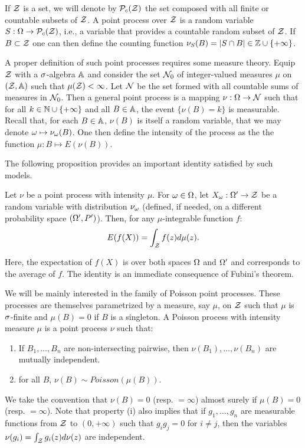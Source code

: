 If ${\mathcal Z}$ is a set, we will denote by ${\mathcal P}_c({\mathcal Z})$ the set composed with all finite or countable subsets of ${\mathcal Z}$. 
A point process over ${\mathcal Z}$ is a random variable $S: \Omega \to {\mathcal P}_c({\mathcal Z})$, i.e., a variable that provides a countable random subset of ${\mathcal Z}$. If $B\subset {\mathcal Z}$ one can then define the counting function $\nu_S(B) = |S \cap B| \in {\mathbb{Z}}\cup\{+\infty\}$.

A proper definition of such point processes requires some measure theory. Equip ${\mathcal Z}$ with a $\sigma$-algebra ${\mathbb A}$ and consider the set ${\mathcal N}_0$ of integer-valued measures $\mu$ on $({\mathcal Z}, {\mathbb A})$ such that $\mu({\mathcal Z}) <\infty$. Let ${\mathcal N}$ be the set formed with all countable sums of measures in ${\mathcal N}_0$. Then a general point process is a mapping $\nu: \Omega \to {\mathcal N}$ such that for all $k\in  {\mathbb{N}}\cup\{+\infty\}$ and  all $B\in {\mathbb A}$, the event $\{\nu(B) = k\}$ is measurable. Recall that, for each $B\in {\mathbb A}$, $\nu(B)$ is itself a random variable, that we may denote $\omega \mapsto \nu_\omega(B)$. One then define the intensity of the process as the the function $\mu : B \mapsto E(\nu(B))$.


The following proposition provides an important identity satisfied by such models.
\begin{theorem}
\label{th:campbell}
Let $\nu$ be a point process with intensity $\mu$. For $\omega\in \Omega$, let $X_\omega: \Omega' \to {\mathcal Z}$ be a random variable with distribution $\nu_\omega$ (defined, if needed, on a different probability space $(\Omega', P')$). Then, for any $\mu$-integrable function $f$:
\begin{equation}
\label{eq:campbell}
E(f(X)) = \int_{{\mathcal Z}} f(z) d\mu(z).
\end{equation}
\end{theorem}
Here, the expectation of $f(X)$ is over both spaces $\Omega$ and $\Omega'$ and corresponds to the average of $f$. 
The identity is an immediate consequence of Fubini's theorem.
\bigskip


We will be mainly interested in the family of Poisson point processes. These processes are themselves parametrized by a measure, say $\mu$, on ${\mathcal Z}$ such that $\mu$ is $\sigma$-finite and $\mu(B) = 0$ if $B$ is a singleton. A Poisson process with intensity measure $\mu$ is a point process $\nu$ such that: 
\begin{enumerate}[label = (\roman*)]
\item If $B_1, \ldots , B_n$ are non-intersecting pairwise, then $\nu(B_1), \ldots, \nu(B_n)$ are mutually independent.
\item for all $B$, $\nu(B) \sim \mathit{Poisson}(\mu(B))$. 
\end{enumerate}
We take the convention that $\nu(B) = 0$ (resp. $=\infty$)  almost surely if $\mu(B)=0$ (resp. $=\infty$). Note that  property (i) also implies that if $g_1, \ldots, g_n$ are measurable functions from ${\mathcal Z}$ to $(0, +\infty)$ such that $g_ig_j = 0$ for $i\neq j$, then the variables $\nu(g_i) = \int_{{\mathcal Z}} g_i(z) d\nu(z)$ are independent.
\bigskip


